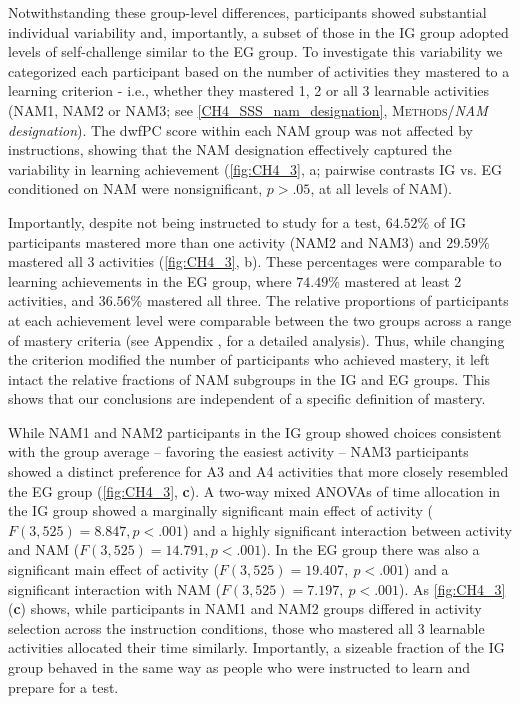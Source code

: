 Notwithstanding these group-level differences, participants showed substantial individual variability and, importantly, a subset of those in the \ac{IG} group adopted levels of self-challenge similar to the \ac{EG} group. To investigate this variability we categorized each participant based on the number of activities they mastered to a learning criterion - i.e., whether they mastered 1, 2 or all 3 learnable activities (\ac{NAM}1, \ac{NAM}2 or \ac{NAM}3; see \cref{CH4_SSS_nam_designation}, \textsc{Methods}/\textit{\ac{NAM} designation}). The \ac{dwfPC} score within each \ac{NAM} group was not affected by instructions, showing that the \ac{NAM} designation effectively captured the variability in learning achievement (\cref{fig:CH4_3}, a; pairwise contrasts \ac{IG} vs. \ac{EG} conditioned on \ac{NAM} were nonsignificant, $p>.05$, at all levels of \ac{NAM}).

Importantly, despite not being instructed to study for a test, $64.52\%$ of \ac{IG} participants mastered more than one activity (\ac{NAM}2 and \ac{NAM}3) and $29.59\%$ mastered all 3 activities (\cref{fig:CH4_3}, b). These percentages were comparable to learning achievements in the \ac{EG} group, where $74.49\%$ mastered at least 2 activities, and $36.56\%$ mastered all three. The relative proportions of participants at each achievement level were comparable between the two groups across a range of mastery criteria (see Appendix , for a detailed analysis). Thus, while changing the criterion modified the number of participants who achieved mastery, it left intact the relative fractions of \ac{NAM} subgroups in the \ac{IG} and \ac{EG} groups. This shows that our conclusions are independent of a specific definition of mastery.

While \ac{NAM}1 and \ac{NAM}2 participants in the \ac{IG} group showed choices consistent with the group average -- favoring the easiest activity -- \ac{NAM}3 participants showed a distinct preference for A3 and A4 activities that more closely resembled the \ac{EG} group (\cref{fig:CH4_3}, \textbf{c}). A two-way mixed ANOVAs of time allocation in the \ac{IG} group showed a marginally significant main effect of activity ($F(3,525) = 8.847, p < .001$) and a highly significant interaction between activity and \ac{NAM} ($F(3,525)=14.791, p < .001$). In the \ac{EG} group there was also a significant main effect of activity ($F(3,525) = 19.407,\ p<.001$) and a significant interaction with \ac{NAM} ($F(3,525) = 7.197,\ p<.001$). As \cref{fig:CH4_3} (\textbf{c}) shows, while participants in \ac{NAM}1 and \ac{NAM}2 groups differed in activity selection across the instruction conditions, those who mastered all 3 learnable activities allocated their time similarly. Importantly, a sizeable fraction of the \ac{IG} group behaved in the same way as people who were instructed to learn and prepare for a test.

